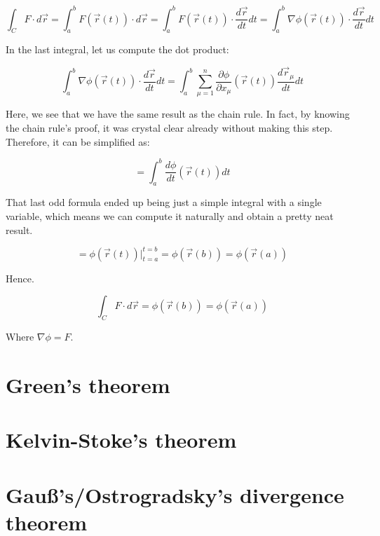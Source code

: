 \documentclass[12pt]{article}
\begin{document}
	\[
		\int_C F \cdot d\vec{r}
		= \int_a^b F(\vec{r}(t)) \cdot d\vec{r}
		= \int_a^b F(\vec{r}(t)) \cdot \frac{d\vec{r}}{dt}dt
		= \int_a^b \nabla \phi(\vec{r}(t)) \cdot \frac{d\vec{r}}{dt}dt
	\]
	
	In the last integral, let us compute the dot product:
	
	\[
		\int_a^b \nabla \phi(\vec{r}(t)) \cdot \frac{d\vec{r}}{dt}dt
		= \int_a^b \sum_{\mu = 1}^n \frac{\partial \phi}{\partial x_\mu}(\vec{r}(t)) \frac{d\vec{r}_\mu}{dt} dt
	\]
	
	Here, we see that we have the same result as the chain rule. In fact, by knowing the chain rule's proof, it was crystal clear already without making this step. Therefore, it can be simplified as:
	
	\[
		= \int_a^b \frac{d\phi}{dt}(\vec{r}(t)) dt
	\]
	
	That last odd formula ended up being just a simple integral with a single variable, which means we can compute it naturally and obtain a pretty neat result.
	
	\[
		= \phi(\vec{r}(t)) \bigg|_{t=a}^{t=b} = \phi(\vec{r}(b)) = \phi(\vec{r}(a))
	\]
	
	Hence.
	
	\[
		\int_C F \cdot d\vec{r}
		= \phi(\vec{r}(b)) = \phi(\vec{r}(a))
	\]
	
	Where $\nabla \phi = F$.
	
	\section{Green's theorem}
	
	\section{Kelvin-Stoke’s theorem}
	
	\section{Gauß’s/Ostrogradsky’s divergence theorem}
	
\end{document}
